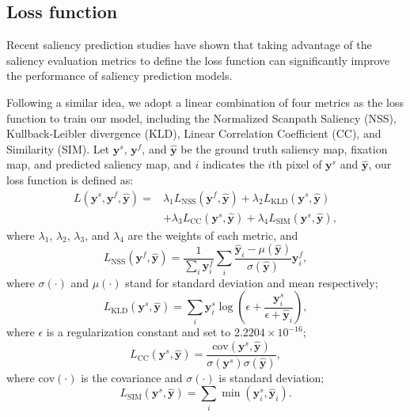\documentclass{article}
\begin{document}
\subsection{Loss function}

Recent saliency prediction studies \cite{SAM_Cornia,EML-NET,GAZEGAN}  have shown that taking advantage of the saliency evaluation metrics to define the loss function can significantly improve the performance of saliency prediction models. 

Following a similar idea, we adopt a linear combination of four metrics as the loss function to train our model, including the Normalized Scanpath Saliency (NSS), Kullback-Leibler divergence (KLD), Linear Correlation Coefficient (CC), and Similarity (SIM). 
Let $\textbf{y}^s$, $\textbf{y}^f$, and $\hat{\textbf{y}}$ be the ground truth saliency map, fixation map, and predicted saliency map, and $i$ indicates the $i$th pixel of $\textbf{y}^s$ and $\hat{\textbf{y}}$, our loss function is defined as:
\begin{equation}
\begin{split}
L(\textbf{y}^s,\textbf{y}^f,\hat{\textbf{y}}) = & {{\lambda}_1}
L_{\text{NSS}}(\textbf{y}^f,\hat{\textbf{y}})+{{\lambda}_2}L_{\text{KLD}}(\textbf{y}^s,\hat{\textbf{y}})\\&+ {{\lambda}_3}L_{\text{CC}}(\textbf{y}^s,\hat{\textbf{y}})+{{\lambda}_4}L_{\text{SIM}}(\textbf{y}^s,\hat{\textbf{y}}),
\end{split}
\end{equation}
where ${\lambda}_1$, ${\lambda}_2$, ${\lambda}_3$, and ${\lambda}_4$ are the weights of each metric, and
\begin{equation}
L_{\text{NSS}}(\textbf{y}^f,\hat{\textbf{y}}) = \frac{1}{\sum_{i} {\textbf{y}_i^f} }  \sum_{i}\frac{\hat{\textbf{y}}_i - \mu(\hat{\textbf{y}})}{\sigma(\hat{\textbf{y}})}  {\textbf{y}_i^f},
\end{equation}
where $\sigma(\cdot)$ and $\mu(\cdot)$ stand for standard deviation and mean respectively;
\begin{equation}
L_{\text{KLD}}(\textbf{y}^s,\hat{\textbf{y}}) = \sum_{i}\textbf{y}^s_i \log(\epsilon +  \frac{\textbf{y}^s_i}{\epsilon + \hat{\textbf{y}}_i}),
\end{equation}
where $\epsilon$ is a regularization constant and set to $2.2204\times10^{-16}$;
\begin{equation}
L_{\text{CC}}(\textbf{y}^s,\hat{\textbf{y}}) = \frac{\mathrm{cov}(\textbf{y}^s,\hat{\textbf{y}})}{\sigma(\textbf{y}^s) \sigma(\hat{\textbf{y}})},
\end{equation}
where $\mathrm{cov}(\cdot)$ is the covariance and $\sigma(\cdot)$ is standard deviation;
\begin{equation}
L_{\text{SIM}}(\textbf{y}^s,\hat{\textbf{y}}) = \sum_{i} \min(\textbf{y}^s_i,\hat{\textbf{y}}_i).
\end{equation}
\end{document}
